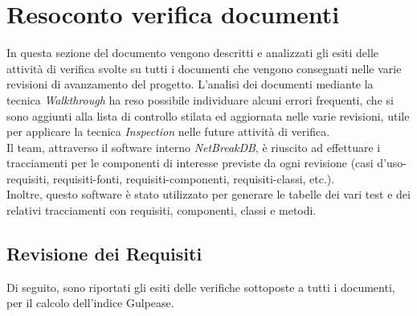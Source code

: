 \newpage
\section{Resoconto verifica documenti}

In questa sezione del documento vengono descritti e analizzati gli esiti delle attività di verifica svolte su tutti i documenti che vengono consegnati nelle varie revisioni di avanzamento del progetto.
L’analisi dei documenti mediante la tecnica \textit{Walkthrough} ha reso possibile individuare alcuni errori frequenti, che si sono aggiunti alla lista di controllo stilata ed aggiornata nelle varie revisioni, utile per applicare la tecnica \textit{Inspection} nelle future attività di verifica.\\
Il team, attraverso il software interno \textit{NetBreakDB}, è riuscito ad effettuare i tracciamenti per le componenti di interesse previste da ogni revisione (casi d’uso-requisiti, requisiti-fonti, requisiti-componenti, requisiti-classi, etc.).\\
Inoltre, questo software è stato utilizzato per generare le tabelle dei vari test e dei relativi tracciamenti con requisiti, componenti, classi e metodi.
	
	\subsection{Revisione dei Requisiti}
	Di seguito, sono riportati gli esiti delle verifiche sottoposte a tutti i documenti, per il calcolo dell’indice Gulpease.
	
